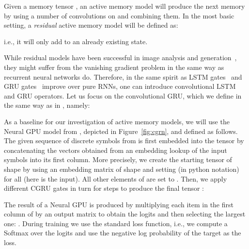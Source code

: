 \documentclass{article}
\begin{document}
Given a memory tensor , an active memory model will produce the next
memory  by using a number of convolutions on  and combining them.
In the most basic setting, a \emph{residual} active memory model
will be defined as:

i.e., it will only add to an already existing state.

While residual models have been successful in image analysis \cite{resnet} and
generation~\cite{one_shot}, they might suffer from the vanishing gradient problem
in the same way as recurrent neural networks do. Therefore, in the same spirit
as LSTM gates~\cite{hochreiter1997} and GRU gates~\cite{gru2014} improve
over pure RNNs, one can introduce convolutional LSTM and GRU operators.
Let us focus on the convolutional GRU, which we define in the same
way as in \cite{neural_gpu}, namely:


As a baseline for our investigation of active memory models,
we will use the Neural GPU model from \cite{neural_gpu},
depicted in Figure~\ref{fig:cgrn}, and defined as follows.
The given sequence  of  discrete symbols
from  is first embedded
into the tensor  by concatenating the vectors obtained from
an embedding lookup of the input symbols into its first column.
More precisely, we create the starting tensor  of shape
 by using an embedding matrix  of shape 
and setting  (in python notation)
for all   (here  is the input).
All other elements of  are set to .
Then, we apply  different CGRU gates
in turn for  steps to produce the final tensor :

The result of a Neural GPU is produced by multiplying each item in
the first column of  by an output matrix  to obtain the logits
 and then selecting the largest one:
. During training we use the standard loss function,
i.e., we compute a Softmax over the logits  and use
the negative log probability of the target as the loss.
\end{document}
